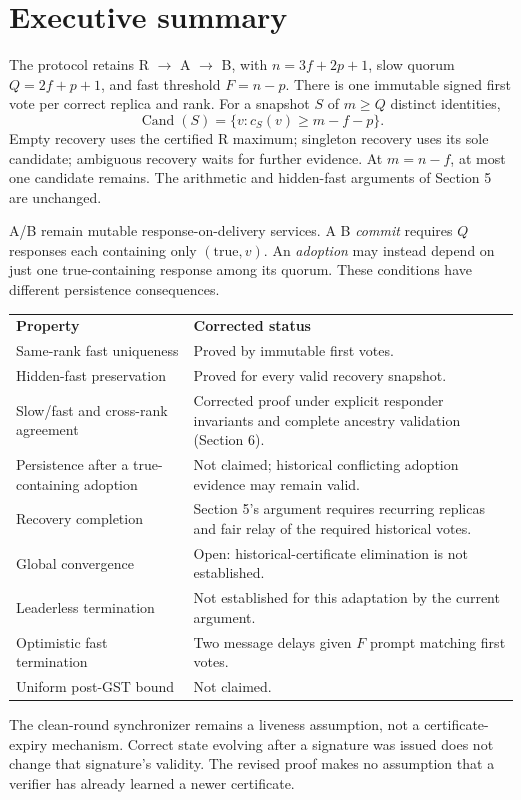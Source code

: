 \documentclass[11pt,a4paper]{article}
\newcommand{\page}[1]{\clearpage\setcounter{page}{#1}}
\begin{document}
\section*{Executive summary}
The protocol retains R $\to$ A $\to$ B, with $n=3f+2p+1$, slow quorum $Q=2f+p+1$, and fast threshold $F=n-p$. There is one immutable signed first vote per correct replica and rank. For a snapshot $S$ of $m\ge Q$ distinct identities,
\[
\operatorname{Cand}(S)=\{v:c_S(v)\ge m-f-p\}.
\]
Empty recovery uses the certified R maximum; singleton recovery uses its sole candidate; ambiguous recovery waits for further evidence. At $m=n-f$, at most one candidate remains. The arithmetic and hidden-fast arguments of Section 5 are unchanged.

A/B remain mutable response-on-delivery services. A B \emph{commit} requires $Q$ responses each containing only $(\mathrm{true},v)$. An \emph{adoption} may instead depend on just one true-containing response among its quorum. These conditions have different persistence consequences.

\begin{tabular}{p{}p{}}
\textbf{Property} & \textbf{Corrected status}\\[5pt]
Same-rank fast uniqueness & Proved by immutable first votes.\\[5pt]
Hidden-fast preservation & Proved for every valid recovery snapshot.\\[5pt]
Slow/fast and cross-rank agreement & Corrected proof under explicit responder invariants and complete ancestry validation (Section 6).\\[5pt]
Persistence after a true-containing adoption & Not claimed; historical conflicting adoption evidence may remain valid.\\[5pt]
Recovery completion & Section 5's argument requires recurring replicas and fair relay of the required historical votes.\\[5pt]
Global convergence & Open: historical-certificate elimination is not established.\\[5pt]
Leaderless termination & Not established for this adaptation by the current argument.\\[5pt]
Optimistic fast termination & Two message delays given $F$ prompt matching first votes.\\[5pt]
Uniform post-GST bound & Not claimed.
\end{tabular}

The clean-round synchronizer remains a liveness assumption, not a certificate-expiry mechanism. Correct state evolving after a signature was issued does not change that signature's validity. The revised proof makes no assumption that a verifier has already learned a newer certificate.
\page{10}
\end{document}
